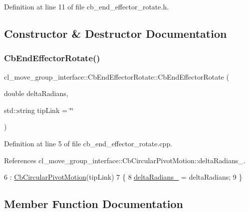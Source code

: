 Definition at line 11 of file cb\+\_\+end\+\_\+effector\+\_\+rotate.\+h.



\subsection{Constructor \& Destructor Documentation}
\mbox{\label{classcl__move__group__interface_1_1CbEndEffectorRotate_a5a3f91fcbb0196baeaae40c4c38a59e8}} 
\subsubsection{\texorpdfstring{Cb\+End\+Effector\+Rotate()}{CbEndEffectorRotate()}}
{\footnotesize\ttfamily cl\+\_\+move\+\_\+group\+\_\+interface\+::\+Cb\+End\+Effector\+Rotate\+::\+Cb\+End\+Effector\+Rotate (\begin{DoxyParamCaption}\item[{double}]{delta\+Radians,  }\item[{std\+::string}]{tip\+Link = {\ttfamily \char`\"{}\char`\"{}} }\end{DoxyParamCaption})}



Definition at line 5 of file cb\+\_\+end\+\_\+effector\+\_\+rotate.\+cpp.



References cl\+\_\+move\+\_\+group\+\_\+interface\+::\+Cb\+Circular\+Pivot\+Motion\+::delta\+Radians\+\_\+.


\begin{DoxyCode}
6         : \hyperlink{classcl__move__group__interface_1_1CbCircularPivotMotion_adc0d93cb33df529d6a1e277fed25ceb1}{CbCircularPivotMotion}(tipLink)
7     \{
8         \hyperlink{classcl__move__group__interface_1_1CbCircularPivotMotion_afade33f1182615c64ea972075bfd2b95}{deltaRadians\_} = deltaRadians;
9     \}
\end{DoxyCode}


\subsection{Member Function Documentation}
\mbox{\label{classcl__move__group__interface_1_1CbEndEffectorRotate_a3e60bfba48906696587d66af89f7ee2b}} 
